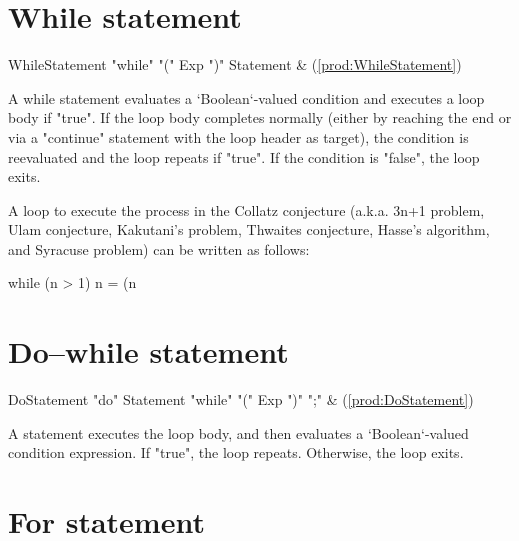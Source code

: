 \section{While statement}

\begin{bbgrammar}
      WhileStatement \: \xcd"while" \xcd"(" Exp \xcd")" Statement & (\ref{prod:WhileStatement}) \\
\end{bbgrammar}

A while statement evaluates a \xcd`Boolean`-valued condition and executes a
loop body if \xcd"true". If the loop body completes normally (either by
reaching the end or via a \xcd"continue" statement with the loop header as
target), the condition is reevaluated and the loop repeats if \xcd"true". If
the condition is \xcd"false", the loop exits.

\begin{ex}
A loop to execute the process in the Collatz conjecture (a.k.a. 3n+1 problem,
Ulam conjecture, Kakutani's problem, Thwaites conjecture, Hasse's algorithm,
and Syracuse problem) can be written as follows:
\begin{xten}
  while (n > 1) {
     n = (n %
  }
\end{xten}
\end{ex}
\section{Do--while statement}

\begin{bbgrammar}
         DoStatement \: \xcd"do" Statement \xcd"while" \xcd"(" Exp \xcd")" \xcd";" & (\ref{prod:DoStatement}) \\
\end{bbgrammar}


A  statement executes the loop body, and then evaluates a
\xcd`Boolean`-valued condition expression. If \xcd"true", the loop repeats.
Otherwise, the loop exits.


\section{For statement}

